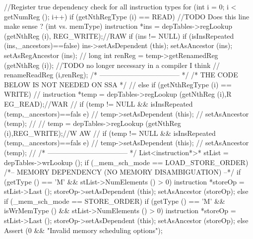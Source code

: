 \begin{DoxyCode}
                                                                  {
        //Register true dependency check for all instruction types
        for (int i = 0; i < getNumReg (); i++) {
                if (getNthRegType (i) == READ) { //TODO Does this line make sense
      ? (int vs. memType)
                        instruction *ins = depTables->regLookup (getNthReg (i),
      REG_WRITE);//RAW
                        if (ins != NULL) {
                                if (isInsRepeated (ins,_ancestors)==false) {
                                        ins->setAsDependent (this);
                                        setAsAncestor (ins);
                                        setAsRegAncestor (ins);
                                }
//                              long int renReg = temp->getRenamedReg (getNthReg 
      (i)); //TODO no longer necessary in a compiler I think
//                              renameReadReg (i,renReg);
                        }
        /* ----------------------------------- */
        /* THE CODE BELOW IS NOT NEEDED ON SSA */
                // } else if (getNthRegType (i) == WRITE) {
                //      instruction *temp = depTables->regLookup (getNthReg (i),R
      EG_READ);//WAR
                //      if (temp != NULL && isInsRepeated (temp,_ancestors)==fals
      e) {
                //              temp->setAsDependent (this);
                //              setAsAncestor (temp);
                //      }
                //      temp = depTables->regLookup (getNthReg (i),REG_WRITE);//W
      AW
                //      if (temp != NULL && isInsRepeated (temp,_ancestors)==fals
      e) {
                //              temp->setAsDependent (this);
                //              setAsAncestor (temp);
                //      }
        /* ----------------------------------- */
                }
        }
        List<instruction*>* stList = depTables->wrLookup ();
    if (_mem_sch_mode == LOAD_STORE_ORDER) {
            /*-- MEMORY DEPENDENCY (NO MEMORY DISAMBIGUATION) --*/
        if (getType () == 'M' && stList->NumElements () > 0) {
            instruction *storeOp = stList->Last ();
            storeOp->setAsDependent (this);
            setAsAncestor (storeOp);
        }
    } else if (_mem_sch_mode == STORE_ORDER) {
        if (getType () == 'M' && isWrMemType () && stList->NumElements () > 0) {
            instruction *storeOp = stList->Last ();
            storeOp->setAsDependent (this);
            setAsAncestor (storeOp);
        }
    } else { Assert (0 && "Invalid memory scheduling options"); }

}
\end{DoxyCode}
